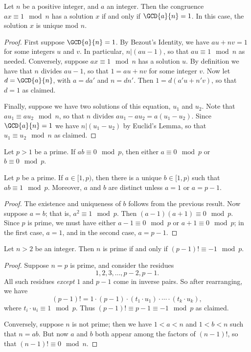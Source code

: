 \documentclass{article}
\begin{document}

\begin{thm}
Let $n$ be a positive integer, and $a$ an integer. Then the congruence $ax \equiv 1 \mod n$ has a solution $x$ if and only if $\GCD{a}{n} = 1$. In this case, the solution $x$ is unique mod $n$.
\end{thm}

\begin{proof}
First suppose $\GCD{a}{n} = 1$. By Bezout's Identity, we have $au + nv = 1$ for some integers $u$ and $v$. In particular, $n|(au - 1)$, so that $au \equiv 1 \mod n$ as needed. Conversely, suppose $ax \equiv 1 \mod n$ has a solution $u$. By definition we have that $n$ divides $au - 1$, so that $1 = au + nv$ for some integer $v$. Now let $d = \GCD{a}{n}$, with $a = da'$ and $n = dn'$. Then $1 = d(a'u + n'v)$, so that $d = 1$ as claimed.

Finally, suppose we have two solutions of this equation, $u_1$ and $u_2$. Note that $au_1 \equiv au_2 \mod n$, so that $n$ divides $au_1 - au_2 = a(u_1 - u_2)$. Since $\GCD{a}{n} = 1$ we have $n|(u_1 - u_2)$ by Euclid's Lemma, so that $u_1 \equiv u_2 \mod n$ as claimed.
\end{proof}

\begin{cor}
Let $p > 1$ be a prime. If $ab \equiv 0 \mod p$, then either $a \equiv 0 \mod p$ or $b \equiv 0 \mod p$.
\end{cor}

\begin{cor}
Let $p$ be a prime. If $a \in [1,p)$, then there is a unique $b \in [1,p)$ such that $ab \equiv 1 \mod p$. Moreover, $a$ and $b$ are distinct unless $a = 1$ or $a = p-1$.
\end{cor}

\begin{proof}
The existence and uniqueness of $b$ follows from the previous result. Now suppose $a = b$; that is, $a^2 \equiv 1 \mod p$. Then $(a-1)(a+1) \equiv 0 \mod p$. Since $p$ is prime, we must have either $a-1 \equiv 0 \mod p$ or $a+1 \equiv 0 \mod p$; in the first case, $a = 1$, and in the second case, $a = p-1$.
\end{proof}

\begin{cor}
Let $n > 2$ be an integer. Then $n$ is prime if and only if $(p-1)! \equiv -1 \mod p$.
\end{cor}

\begin{proof}
Suppose $n = p$ is prime, and consider the residues \[1, 2, 3, \ldots, p-2, p-1.\] All such residues \emph{except} $1$ and $p-1$ come in inverse pairs. So after rearranging, we have \[ (p-1)! = 1 \cdot (p-1) \cdot (t_1 \cdot u_1) \cdot \cdots \cdot (t_k \cdot u_k), \] where $t_i \cdot u_i \equiv 1 \mod p$. Thus $(p-1)! \equiv p-1 \equiv -1 \mod p$ as claimed.

Conversely, suppose $n$ is not prime; then we have $1 < a < n$ and $1 < b < n$ such that $n = ab$. But now $a$ and $b$ both appear among the factors of $(n-1)!$, so that $(n-1)! \equiv 0 \mod n$.
\end{proof}
\end{document}
